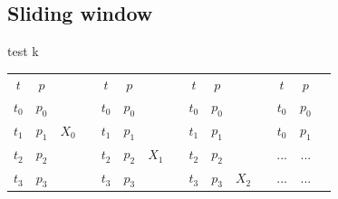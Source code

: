 \documentclass
[twocolumn,
secnumarabic,
nobibnotes,
aps,
prl,
reprint,
groupedaddress,
amsmath,
amssymb,
]{revtex4-2}
\begin{document}
\subsection{Sliding window}
test k
\begin{center}%
  \begin{tabular}{|c|c|cc|c|c|cc|c|c|cc|c|c|c}
  \cline{1-2} \cline{5-6} \cline{9-10} \cline{13-14}
  \textbf{$t$} & \textbf{$p$}                  &                &  & \textbf{$t$}                  & \textbf{$p$}                  &                &  & \textbf{$t$}                  & \textbf{$p$}                  &                &  & \textbf{$t$}                  & \textbf{$p$}                      &                  \\ \cline{1-2} \cline{5-6} \cline{9-10} \cline{13-14}
  $t_0$        & \cellcolor[HTML]{C0C0C0}$p_0$ &                &  & \cellcolor[HTML]{FFFFFF}$t_0$ & \cellcolor[HTML]{FFFFFF}$p_0$ &                &  & \cellcolor[HTML]{FFFFFF}$t_0$ & \cellcolor[HTML]{FFFFFF}$p_0$ &                &  & \cellcolor[HTML]{FFFFFF}$t_0$ & \cellcolor[HTML]{FFFFFF}$p_0$     &                  \\ \cline{1-2} \cline{5-6} \cline{9-10} \cline{13-14}
  $t_1$        & \cellcolor[HTML]{C0C0C0}$p_1$ & \textbf{$X_0$} &  & $t_1$                         & \cellcolor[HTML]{C0C0C0}$p_1$ &                &  & \cellcolor[HTML]{FFFFFF}$t_1$ & \cellcolor[HTML]{FFFFFF}$p_1$ &                &  & \cellcolor[HTML]{FFFFFF}$t_0$ & \cellcolor[HTML]{FFFFFF}$p_1$     &                  \\ \cline{1-2} \cline{5-6} \cline{9-10} \cline{13-14}
  $t_2$        & \cellcolor[HTML]{C0C0C0}$p_2$ &                &  & $t_2$                         & \cellcolor[HTML]{C0C0C0}$p_2$ & \textbf{$X_1$} &  & $t_2$                         & \cellcolor[HTML]{C0C0C0}$p_2$ & \textbf{}      &  & \cellcolor[HTML]{FFFFFF}...   & \cellcolor[HTML]{FFFFFF}...       &                  \\ \cline{1-2} \cline{5-6} \cline{9-10} \cline{13-14}
  $t_3$        & \cellcolor[HTML]{C0C0C0}$p_3$ &                &  & $t_3$                         & \cellcolor[HTML]{C0C0C0}$p_3$ &                &  & $t_3$                         & \cellcolor[HTML]{C0C0C0}$p_3$ & \textbf{$X_2$} &  & \cellcolor[HTML]{FFFFFF}...   & \cellcolor[HTML]{FFFFFF}...       &                  \\ \cline{1-2} \cline{5-6} \cline{9-10} \cline{13-14}

\end{tabular}
\end{center}
\end{document}
